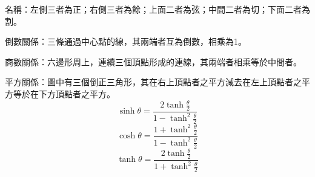 \documentclass[a4paper,12pt]{report}
\begin{document}
\bit
\item 名稱：左側三者為正；右側三者為餘；上面二者為弦；中間二者為切；下面二者為割。
\item 倒數關係：三條通過中心點的線，其兩端者互為倒數，相乘為1。
\item 商數關係：六邊形周上，連續三個頂點形成的連線，其兩端者相乘等於中間者。
\item 平方關係：圖中有三個倒正三角形，其在右上頂點者之平方減去在左上頂點者之平方等於在下方頂點者之平方。
\eit
{}
\[\sinh\theta=\frac{2\tanh\frac{\theta}{2}}{1-\tanh^2\frac{\theta}{2}}\]
\[\cosh\theta=\frac{1+\tanh^2\frac{\theta}{2}}{1-\tanh^2\frac{\theta}{2}}\]
\[\tanh\theta=\frac{2\tanh\frac{\theta}{2}}{1+\tanh^2\frac{\theta}{2}}\]
\end{document}
